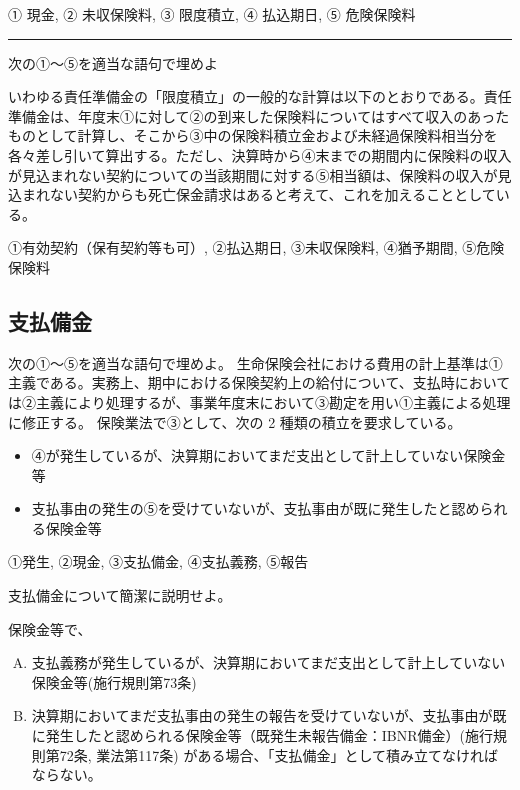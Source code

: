 \documentclass[report,gutter=10mm,fore-edge=10mm,uplatex,dvipdfmx]{jlreq}
\begin{document}

① 現金, ② 未収保険料, ③ 限度積立, ④ 払込期日, ⑤ 危険保険料

\begin{center}\rule{0.5\linewidth}{0.5pt}\end{center}


次の①～⑤を適当な語句で埋めよ

いわゆる責任準備金の「限度積立」の一般的な計算は以下のとおりである。責任準備金は、年度末①に対して②の到来した保険料についてはすべて収入のあったものとして計算し、そこから③中の保険料積立金および未経過保険料相当分を各々差し引いて算出する。ただし、決算時から④末までの期間内に保険料の収入が見込まれない契約についての当該期間に対する⑤相当額は、保険料の収入が見込まれない契約からも死亡保金請求はあると考えて、これを加えることとしている。



①有効契約（保有契約等も可）, ②払込期日, ③未収保険料, ④猶予期間,
⑤危険保険料

\subsection{支払備金}


次の①～⑤を適当な語句で埋めよ。
生命保険会社における費用の計上基準は①主義である。実務上、期中における保険契約上の給付について、支払時においては②主義により処理するが、事業年度末において③勘定を用い①主義による処理に修正する。
保険業法で③として、次の 2 種類の積立を要求している。

\begin{itemize}
\tightlist
\item
  ④が発生しているが、決算期においてまだ支出として計上していない保険金等
\item
  支払事由の発生の⑤を受けていないが、支払事由が既に発生したと認められる保険金等
\end{itemize}



①発生, ②現金, ③支払備金, ④支払義務, ⑤報告


支払備金について簡潔に説明せよ。


保険金等で、
\begin{enumerate} [A.]
 \item 支払義務が発生しているが、決算期においてまだ支出として計上していない保険金等(施行規則第73条)
\item 決算期においてまだ支払事由の発生の報告を受けていないが、支払事由が既に発生したと認められる保険金等（既発生未報告備金：IBNR備金）(施行規則第72条,
 業法第117条) がある場合、「支払備金」として積み立てなければならない。
\end{enumerate}
\end{document}
